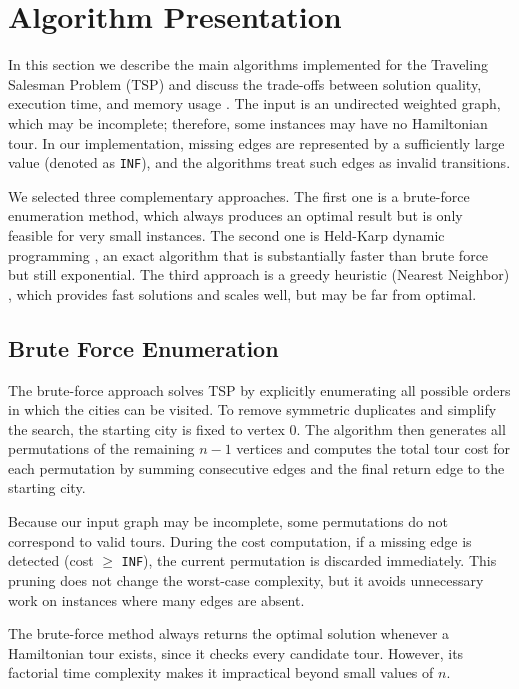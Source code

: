 \section{Algorithm Presentation}
\label{sec:algorithms}

In this section we describe the main algorithms implemented for the Traveling Salesman Problem (TSP) and discuss the trade-offs between solution quality, execution time, and memory usage \cite{cormen2009,applegate2006,gutin2002}. The input is an undirected weighted graph, which may be incomplete; therefore, some instances may have no Hamiltonian tour. In our implementation, missing edges are represented by a sufficiently large value (denoted as \texttt{INF}), and the algorithms treat such edges as invalid transitions.

We selected three complementary approaches. The first one is a brute-force enumeration method, which always produces an optimal result but is only feasible for very small instances. The second one is Held-Karp dynamic programming \cite{gfg_tsp_dp}, an exact algorithm that is substantially faster than brute force but still exponential. The third approach is a greedy heuristic (Nearest Neighbor) \cite{gfg_tsp_greedy}, which provides fast solutions and scales well, but may be far from optimal.

\subsection{Brute Force Enumeration}

The brute-force approach solves TSP by explicitly enumerating all possible orders in which the cities can be visited. To remove symmetric duplicates and simplify the search, the starting city is fixed to vertex 0. The algorithm then generates all permutations of the remaining $n - 1$ vertices and computes the total tour cost for each permutation by summing consecutive edges and the final return edge to the starting city.

Because our input graph may be incomplete, some permutations do not correspond to valid tours. During the cost computation, if a missing edge is detected (cost $\ge$ \texttt{INF}), the current permutation is discarded immediately. This pruning does not change the worst-case complexity, but it avoids unnecessary work on instances where many edges are absent.

The brute-force method always returns the optimal solution whenever a Hamiltonian tour exists, since it checks every candidate tour. However, its factorial time complexity makes it impractical beyond small values of $n$.

